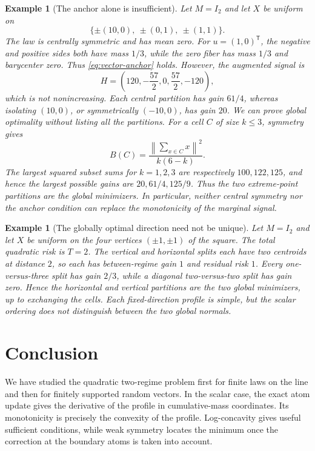 \documentclass[a4paper]{amsart}
\numberwithin{equation}{section}
\newtheorem{example}[theorem]{Example}
\theoremstyle{remark}
\newcommand{\1}{\mathbf 1}
\begin{document}
\begin{example}[The anchor alone is insufficient]
\label{ex:central-symmetry-insufficient}
Let $M=I_2$ and let $X$ be uniform on
\[
  \{\pm(10,0),\ \pm(0,1),\ \pm(1,1)\}.
\]
The law is centrally symmetric and has mean zero.  For $u=(1,0)^{\mathsf T}$,
the negative and positive sides both have mass $1/3$, while the zero fiber
has mass $1/3$ and barycenter zero.  Thus \eqref{eq:vector-anchor} holds.
However, the augmented signal is
\[
  H=\left(120,-\frac{57}{2},0,\frac{57}{2},-120\right),
\]
which is not nonincreasing.  Each central partition has gain $61/4$,
whereas isolating $(10,0)$, or symmetrically $(-10,0)$, has gain $20$.
We can prove global optimality without listing all the partitions.  For a cell
$C$ of size $k\leq3$, symmetry gives
\[
 B(C)=\frac{\left\|\sum_{x\in C}x\right\|^2}{k(6-k)}.
\]
The largest squared subset sums for $k=1,2,3$ are respectively
$100,122,125$, and hence the largest possible gains are
$20,61/4,125/9$.  Thus the two extreme-point partitions are the global
minimizers.  In particular, neither central symmetry nor the anchor condition
can replace the monotonicity of the marginal signal.
\end{example}

\begin{example}[The globally optimal direction need not be unique]
\label{ex:direction-nonunique}
Let $M=I_2$ and let $X$ be uniform on the four vertices
$(\pm1,\pm1)$ of the square.  The total quadratic risk is $T=2$.
The vertical and horizontal splits each have two centroids at distance $2$,
so each has between-regime gain $1$ and residual risk $1$.
Every one-versus-three split has gain $2/3$, while a diagonal two-versus-two
split has gain zero.  Hence the horizontal and vertical partitions are the
two global minimizers, up to exchanging the cells.  Each fixed-direction
profile is simple, but the scalar ordering does not distinguish between the
two global normals.
\end{example}

\section{Conclusion}\label{sec:conclusion}

We have studied the quadratic two-regime problem first for finite laws on the
line and then for finitely supported random vectors.  In the scalar case, the
exact atom update gives the derivative of the profile in cumulative-mass
coordinates.  Its monotonicity is precisely the convexity of the profile.
Log-concavity gives useful sufficient conditions, while weak symmetry locates
the minimum once the correction at the boundary atoms is taken into account.
\end{document}
